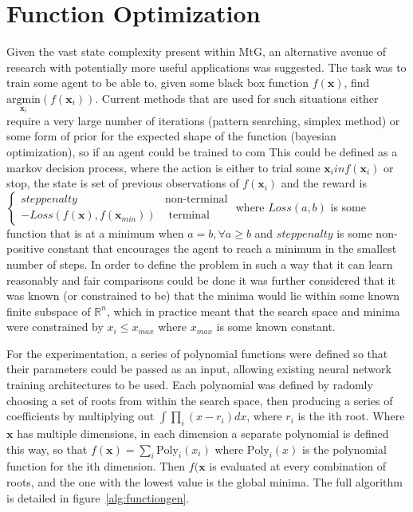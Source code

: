 \section{Function Optimization}
Given the vast state complexity present within MtG, an alternative avenue of research with potentially more useful applications was suggested. The task was to train some agent to be able to, given some black box function $f(\boldsymbol{x})$, find $\underset{\boldsymbol{x}_i}{\text{argmin}} (f(\boldsymbol{x}_i))$. Current methods that are used for such situations either require a very large number of iterations (pattern searching, simplex method) or some form of prior for the expected shape of the function (bayesian optimization), so if an agent could be trained to com
This could be defined as  a markov decision process, where the action is either to trial some $\boldsymbol{x}_i in f(\boldsymbol{x}_i)$ or stop, the state is set of previous observations of $f(\boldsymbol{x}_i)$ and the reward is $\begin{cases}
 step penalty&  \text{non-terminal} \\
-Loss(f(\boldsymbol{x}), f(\boldsymbol{x}_{min})) & \text{ terminal}
\end{cases} $ where $Loss(a,b)$ is some function that is at a minimum when $a = b, \forall a \geq b$ and $step penalty$ is some non-positive constant that encourages the agent to reach a minimum in the smallest number of steps. 
In order to define the problem in such a way that it can learn reasonably and fair comparisons could be done it was further considered that it was known (or constrained to be) that the minima would lie within some known finite subspace of $\mathbb{R}^n$, which in practice meant that the search space and minima were constrained by $x_i \leq x_{max}$ where $x_{max}$ is some known constant.

For the experimentation, a series of polynomial functions were defined so that their parameters could be passed as an input, allowing existing neural network training architectures to be used. Each polynomial was defined by radomly choosing a set of roots from within the search space, then producing a series of coefficients by multiplying out
$\int \prod_i (x - r_i) dx$, where $r_i$ is the ith root. Where $\boldsymbol{x}$ has multiple dimensions, in each dimension a separate polynomial is defined this way, so that $f(\boldsymbol{x})  = \sum_i \text{Poly}_i(x_i)$ where $\text{Poly}_i(x)$ is the polynomial function for the ith dimension. Then $f(\boldsymbol{x}$ is evaluated at every combination of roots, and the one with the lowest value is the global minima. The full algorithm is detailed in figure~\ref{alg:functiongen}.

